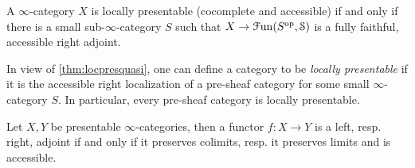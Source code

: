 \documentclass[10pt]{amsart}
\numberwithin{equation}{section}
\begin{document}
\begin{theorem}\label{thm:locpresquasi}
  A $\infty$-category $X$ is locally presentable (cocomplete and accessible) if and only if there is a small sub-$\infty$-category $S$ such that $X\to\mathcal{F}\mathrm{un}(S^{\mathrm{op}},\mathcal{S})$ is a fully faithful, accessible right adjoint. 
\end{theorem}
\begin{remark}
  In view of \cref{thm:locpresquasi}, one can define a category to be \emph{locally presentable} if it is the accessible right localization of a pre-sheaf category for some small $\infty$-category $S$. In particular, every pre-sheaf category is locally presentable. 
\end{remark}
\begin{theorem}
  Let $X,Y$ be presentable $\infty$-categories, then a functor $f:X\to Y$ is a left, resp. right, adjoint if and only if it preserves colimits, resp. it preserves limits and is accessible.
\end{theorem}
\end{document}
